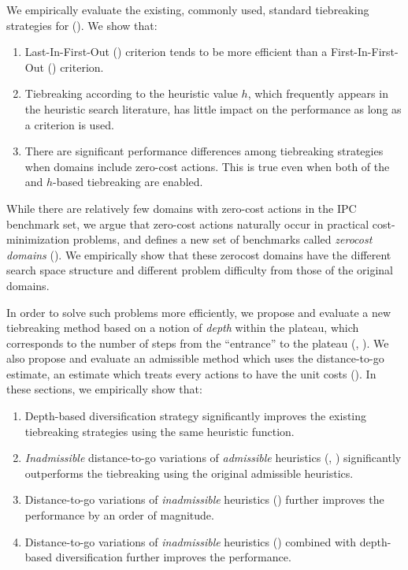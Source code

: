 We empirically evaluate the existing, commonly used, standard
tiebreaking strategies for \astar ().
We show that:

\begin{enumerate}
 \item Last-In-First-Out (\lifo) criterion tends to be more efficient
       than a First-In-First-Out (\fifo) criterion.
 \item Tiebreaking according to the heuristic value $h$, which
       frequently appears in the heuristic search literature, has little
       impact on the performance as long as a \lifo criterion is used.
 \item There are significant performance differences among tiebreaking strategies
       when domains include zero-cost actions. This is true even when
       both of the \lifo and $h$-based tiebreaking are enabled.
\end{enumerate}

While there are relatively few domains with zero-cost actions in the IPC
benchmark set, we argue that zero-cost actions naturally occur in
practical cost-minimization problems, and defines a new set of
benchmarks called \emph{zerocost domains}
().  We empirically show that these
zerocost domains have the different search space structure and different
problem difficulty from those of the original domains.

In order to solve such problems more efficiently, we propose and
evaluate a new
tiebreaking method based on a notion of \emph{depth} within the plateau,
which corresponds to the number of steps from the ``entrance'' to
the plateau (,
). We also propose and evaluate an
admissible method which uses the distance-to-go estimate, an estimate which treats every actions
to have the unit costs ().
In these sections, we empirically show that:
\begin{enumerate}
 \item Depth-based diversification strategy significantly improves the
       existing tiebreaking strategies using the same heuristic function.
 \item \emph{Inadmissible} distance-to-go variations of \emph{admissible} heuristics
       (\lmcut, \mands)
       significantly outperforms the tiebreaking using the original admissible heuristics.
 \item Distance-to-go variations of \emph{inadmissible} heuristics
       (\ff) further improves the performance by an order of magnitude.
 \item Distance-to-go variations of \emph{inadmissible} heuristics
       (\ff) combined with depth-based diversification further
       improves the performance.
\end{enumerate}

